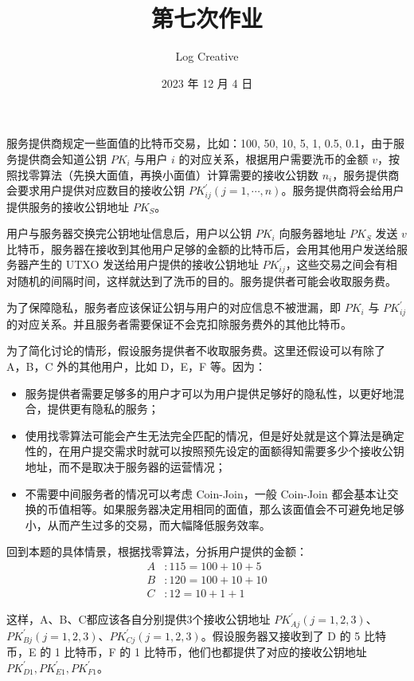 \documentclass{sjtuarticle}
\title{第七次作业}
\author{Log Creative}
\date{2023 年 12 月 4 日}
\def\pk#1{\mathit{PK}_{#1}}
\def\pki#1#2{\mathit{PK}_{#1#2}^\prime}
\begin{document}
\maketitle

服务提供商规定一些面值的比特币交易，比如：100, 50, 10, 5, 1, 0.5, 0.1，由于服务提供商会知道公钥 $\mathit{PK}_i$ 与用户 $i$ 的对应关系，根据用户需要洗币的金额 $v$，按照找零算法（先换大面值，再换小面值）计算需要的接收公钥数 $n_i$，服务提供商会要求用户提供对应数目的接收公钥 $\mathit{PK}_{ij}^\prime (j=1,\cdots,n)$。服务提供商将会给用户提供服务的接收公钥地址 $\mathit{PK}_S$。

用户与服务器交换完公钥地址信息后，用户以公钥 $\mathit{PK}_i$ 向服务器地址 $\mathit{PK}_S$ 发送 $v$ 比特币，服务器在接收到其他用户足够的金额的比特币后，会用其他用户发送给服务器产生的 UTXO 发送给用户提供的接收公钥地址 $\mathit{PK}_{ij}^\prime$，这些交易之间会有相对随机的间隔时间，这样就达到了洗币的目的。服务提供者可能会收取服务费。

为了保障隐私，服务者应该保证公钥与用户的对应信息不被泄漏，即 $\pk{i}$ 与 $\pki{i}{j}$ 的对应关系。并且服务者需要保证不会克扣除服务费外的其他比特币。

为了简化讨论的情形，假设服务提供者不收取服务费。这里还假设可以有除了 A，B，C 外的其他用户，比如 D，E，F 等。因为：
\begin{itemize}
    \item 服务提供者需要足够多的用户才可以为用户提供足够好的隐私性，以更好地混合，提供更有隐私的服务；
    \item 使用找零算法可能会产生无法完全匹配的情况，但是好处就是这个算法是确定性的，在用户提交需求时就可以按照预先设定的面额得知需要多少个接收公钥地址，而不是取决于服务器的运营情况；
    \item 不需要中间服务者的情况可以考虑 Coin-Join，一般 Coin-Join 都会基本让交换的币值相等。如果服务器决定用相同的面值，那么该面值会不可避免地足够小，从而产生过多的交易，而大幅降低服务效率。
\end{itemize}

回到本题的具体情景，根据找零算法，分拆用户提供的金额：
\begin{align*}
    A&: 115 = 100 + 10 + 5 \\
    B&: 120 = 100 + 10 + 10 \\
    C&: 12 = 10 + 1 + 1
\end{align*}

这样，A、B、C都应该各自分别提供3个接收公钥地址 $\mathit{PK}_{Aj}^\prime (j=1,2,3)$、$\mathit{PK}_{Bj}^\prime (j=1,2,3)$、$\mathit{PK}_{Cj}^\prime (j=1,2,3)$。假设服务器又接收到了 D 的 5 比特币，E 的 1 比特币，F 的 1 比特币，他们也都提供了对应的接收公钥地址 $\mathit{PK}_{D1}^\prime, \mathit{PK}_{E1}^\prime, \mathit{PK}_{F1}^\prime$。
\end{document}

